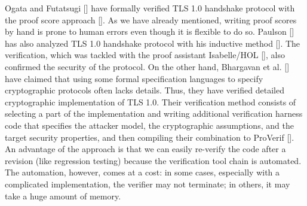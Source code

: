 \documentclass[a4paper,fleqn]{cas-dc}
\begin{document}
Ogata and Futatsugi [\cite{1437139}] have formally verified TLS 1.0 handshake protocol  with the proof score approach [\cite{OgataF03fmoods}].
As we have already mentioned, writing proof scores by hand is prone to human errors even though it is flexible to do so.
Paulson [\cite{Paulson99}] has also analyzed TLS 1.0 handshake protocol  with his inductive method [\cite{Paulson98}].
The verification, which was tackled with the proof assistant Isabelle/HOL [\cite{NipkowPW02}], also confirmed the security of the protocol.
On the other hand,
Bhargavan et al. [\cite{BhargavanFCZ12}] have claimed that using some formal specification languages to specify cryptographic protocols often lacks details.
Thus, they have verified detailed cryptographic implementation of TLS 1.0.
Their verification method consists of selecting a part of the implementation and writing additional verification harness code that specifies the attacker model, the cryptographic
assumptions, and the target security properties, and then compiling their combination to ProVerif [\cite{proverif}]. 
An advantage of the approach is that we can easily re-verify the code after a revision (like regression testing) because the verification tool chain is automated.
The automation, however, comes at a cost: in some cases, especially with a complicated implementation,
the verifier may not terminate; in others, it may take a huge amount of memory.


\end{document}
